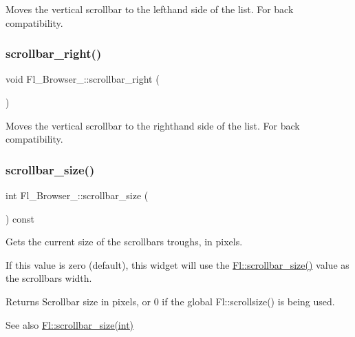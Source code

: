 Moves the vertical scrollbar to the lefthand side of the list. For back compatibility. \mbox{\label{class_fl___browser___a92ef1a69de96f610e2776591ee3bea06}} 
\subsubsection{\texorpdfstring{scrollbar\+\_\+right()}{scrollbar\_right()}}
{\footnotesize\ttfamily void Fl\+\_\+\+Browser\+\_\+\+::scrollbar\+\_\+right (\begin{DoxyParamCaption}{ }\end{DoxyParamCaption})\hspace{0.3cm}{\ttfamily [inline]}}

Moves the vertical scrollbar to the righthand side of the list. For back compatibility. \mbox{\label{class_fl___browser___a89f6b1be07fc063bf8a8d83cb39d5fa0}} 
\subsubsection{\texorpdfstring{scrollbar\+\_\+size()}{scrollbar\_size()}\hspace{0.1cm}{\footnotesize\ttfamily [1/2]}}
{\footnotesize\ttfamily int Fl\+\_\+\+Browser\+\_\+\+::scrollbar\+\_\+size (\begin{DoxyParamCaption}{ }\end{DoxyParamCaption}) const\hspace{0.3cm}{\ttfamily [inline]}}

Gets the current size of the scrollbars\textquotesingle{} troughs, in pixels.

If this value is zero (default), this widget will use the \hyperlink{class_fl_ae861b8bd4f2d4dcbec7be697e8b4b80e}{Fl\+::scrollbar\+\_\+size()} value as the scrollbar\textquotesingle{}s width.

\begin{DoxyReturn}{Returns}
Scrollbar size in pixels, or 0 if the global Fl\+::scrollsize() is being used. 
\end{DoxyReturn}
\begin{DoxySeeAlso}{See also}
\hyperlink{class_fl_aca2f98b26f2552b82dd245b8094a41aa}{Fl\+::scrollbar\+\_\+size(int)} 
\end{DoxySeeAlso}
\mbox{\label{class_fl___browser___a6743b9c1513c68e82543530154cadf57}} 
